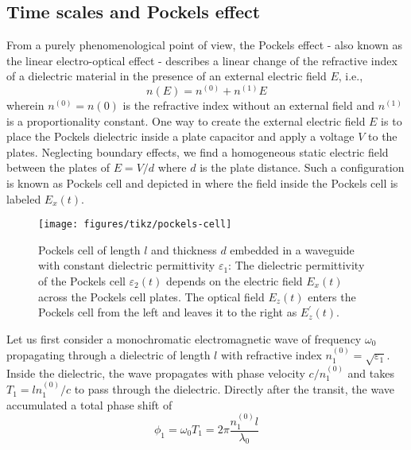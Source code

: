 \subsection{Time scales and Pockels effect}


From a purely phenomenological point of view, the Pockels effect - also known as the linear electro-optical effect - describes a linear change of the refractive index of a dielectric material in the presence of an external electric field $E$, i.e.,
\begin{equation}
	n(E)
	=
	n^{(0)}
	+
	n^{(1)}E
\end{equation}
wherein $n^{(0)}=n(0)$ is the refractive index without an external field and $n^{(1)}$ is a proportionality constant.
One way to create the external electric field $E$ is to place the Pockels dielectric inside a plate capacitor and apply a voltage $V$ to the plates.
Neglecting boundary effects, we find a homogeneous static electric field between the plates of $E=V/d$ where $d$ is the plate distance.
Such a configuration is known as Pockels cell and depicted in  where the field inside the Pockels cell is labeled $E_x(t)$.
\begin{figure}[htb]
    \centering
    \texttt{[image: figures/tikz/pockels-cell]}
    \caption{Pockels cell of length $l$ and thickness $d$ embedded in a waveguide with constant dielectric permittivity $\varepsilon_1$: The dielectric permittivity of the Pockels cell $\varepsilon_2(t)$ depends on the electric field $E_x(t)$ across the Pockels cell plates. The optical field $E_z(t)$ enters the Pockels cell from the left and leaves it to the right as $E^\prime_z(t)$.}\label{fig:pockels_cell}
\end{figure}
Let us first consider a monochromatic electromagnetic wave of frequency $\omega_0$ propagating through a dielectric of length $l$ with refractive index $n_1^{(0)}=\sqrt{\varepsilon_1}$.
Inside the dielectric, the wave propagates with phase velocity $c/n_1^{(0)}$ and takes $T_1=ln_1^{(0)}/c$ to pass through the dielectric.
Directly after the transit, the wave accumulated a total phase shift of
\begin{equation*}
	\phi_1
	=
	\omega_0T_1
	=
	2\pi\frac{n_1^{(0)}l}{\lambda_0}
\end{equation*}
